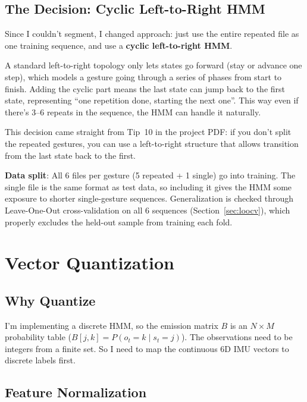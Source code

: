 \documentclass[11pt]{article}
\begin{document}
\subsection{The Decision: Cyclic Left-to-Right HMM}

Since I couldn't segment, I changed approach: just use the entire repeated file as one training sequence, and use a \textbf{cyclic left-to-right HMM}.

A standard left-to-right topology only lets states go forward (stay or advance one step), which models a gesture going through a series of phases from start to finish. Adding the cyclic part means the last state can jump back to the first state, representing ``one repetition done, starting the next one''. This way even if there's 3--6 repeats in the sequence, the HMM can handle it naturally.

This decision came straight from Tip~10 in the project PDF: if you don't split the repeated gestures, you can use a left-to-right structure that allows transition from the last state back to the first.

\textbf{Data split}: All 6 files per gesture (5 repeated + 1 single) go into training. The single file is the same format as test data, so including it gives the HMM some exposure to shorter single-gesture sequences. Generalization is checked through Leave-One-Out cross-validation on all 6 sequences (Section~\ref{sec:loocv}), which properly excludes the held-out sample from training each fold.


\section{Vector Quantization}

\subsection{Why Quantize}

I'm implementing a discrete HMM, so the emission matrix $B$ is an $N \times M$ probability table ($B[j,k] = P(o_t = k \mid s_t = j)$). The observations need to be integers from a finite set. So I need to map the continuous 6D IMU vectors to discrete labels first.

\subsection{Feature Normalization}
\end{document}
